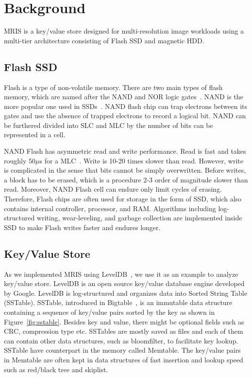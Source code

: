 \section{Background}
\label{sec:bg}

MRIS is a key/value store designed for multi-resolution image
workloads using a multi-tier architecture consisting of Flash SSD and
magnetic HDD.


\subsection{Flash SSD}

Flash is a type of non-volatile memory. There are two main types of
flash memory, which are named after the NAND and NOR logic
gates~\cite{flashwiki}. NAND is the more popular one used in
SSDs~\cite{ssdanatomy}. NAND flash chip can trap electrons
between its gates and use the absence of trapped electrons to record
a logical bit. NAND can be furthered divided into SLC and MLC by the
number of bits can be represented in a cell.

NAND Flash has asymmetric read and write performance. Read is fast and
takes roughly 50$\mu$s for a MLC~\cite{ssdanatomy}. Write is 10-20
times slower than read. However, write is complicated in the sense
that bits cannot be simply overwritten. Before writes, a block has to
be erased, which is a procedure 2-3 order of magnitude slower than
read. Moreover, NAND Flash cell can endure only limit cycles of
erasing. Therefore, Flash chips are often used for storage in the form
of SSD, which also contains internal controller, processor, and RAM.
Algorithms including log-structured writing, wear-leveling, and
garbage collection are implemented inside SSD to make Flash writes
faster and endures longer.


\subsection{Key/Value Store}

As we implemented MRIS using LevelDB~\cite{leveldb-web}, we use it as
an example to analyze key/value store. LevelDB is an open source
key/value database engine developed by Google. LevelDB is
log-structured and organizes data into Sorted String Table (SSTable).
SSTable, introduced in Bigtable~\cite{chang06osdi}, is an immutable
data structure containing a sequence of key/value pairs sorted by the
key as shown in Figure~\ref{fig:sstable}. Besides key and value, there
might be optional fields such as CRC, compression type etc. SSTables
are mostly saved as files and each of them can contain other data
structures, such as bloomfilter, to facilitate key lookup. SSTable
have counterpart in the memory called Memtable. The key/value pairs in
Memtable are often kept in data structures of fast insertion and
lookup speed such as red/black tree and skiplist.

